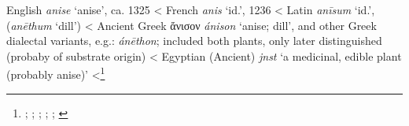 \begin{etymology}\label{ety:anise}
English \textit{anise} `anise', ca. 1325
< French \textit{anis} `id.', 1236
< Latin \textit{anīsum} `id.', (\textit{anēthum} `dill')
< Ancient Greek {ἄνισον} \textit{ánison} `anise; dill', and other Greek dialectal variants, e.g.: \textit{ánēthon}; included both plants, only later distinguished (probaby of substrate origin)
< Egyptian (Ancient) \textit{jnst} `a medicinal, edible plant (probably anise)'
<\footnote{\textcite[s.v. anise]{oed, ahd}; \textcite[s.v. anis]{tlfi}; \textcite{lewis_latin_1879}; \textcite{liddell_greek-english_1940}; \textcite[99]{erman_worterbuch_1926}; \textcite[240]{hemmerdinger_noms_1968}}
\end{etymology}